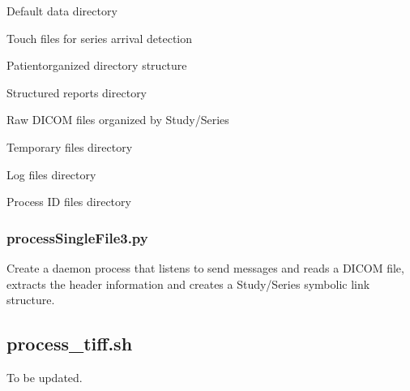 \documentclass[letterpaper,10pt,english]{sphinxmanual}
\begin{document}
\sphinxAtStartPar
{}

\begin{DUlineblock}{0em}
\item[] \sphinxhyphen{}  \sphinxhyphen{} Default data directory
\item[] \sphinxhyphen{}  \sphinxhyphen{} Touch files for series arrival detection
\item[] \sphinxhyphen{}  \sphinxhyphen{} Patient\sphinxhyphen{}organized directory structure
\item[] \sphinxhyphen{}  \sphinxhyphen{} Structured reports directory
\item[] \sphinxhyphen{}  \sphinxhyphen{} Raw DICOM files organized by Study/Series
\item[] \sphinxhyphen{}  \sphinxhyphen{} Temporary files directory
\item[] \sphinxhyphen{}  \sphinxhyphen{} Log files directory
\item[] \sphinxhyphen{}  \sphinxhyphen{} Process ID files directory
\end{DUlineblock}


\subsubsection{processSingleFile3.py}
\label{\detokenize{Architecture/scripts/processSingleFile3:id1}}
\sphinxAtStartPar
Create a daemon process that listens to send messages and reads a DICOM file,
extracts the header information and creates a Study/Series symbolic link structure.
\begin{description}
\sphinxAtStartPar
{}

\end{description}

\sphinxstepscope


\subsection{process\_tiff.sh}
\label{\detokenize{Architecture/scripts/process_tiff:process-tiff-sh}}\label{\detokenize{Architecture/scripts/process_tiff::doc}}
\sphinxAtStartPar
To be updated.
\end{document}
